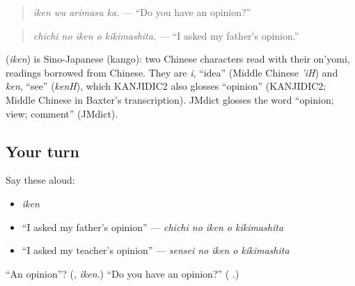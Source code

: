 \begin{quote}
\textbf{ }
\end{quote}

\begin{quote}
\emph{iken wa arimasu ka.} — \textquotedblleft{}Do you have an opinion?\textquotedblright{}
\end{quote}

\begin{quote}
\textbf{  }
\end{quote}

\begin{quote}
\emph{chichi no iken o kikimashita.} — \textquotedblleft{}I asked my father's opinion.\textquotedblright{}
\end{quote}

\begin{cousinweb}
\textbf{} (\emph{iken}) is Sino-Japanese (kango): two Chinese characters read with their on'yomi, readings borrowed from Chinese. They are \emph{i}, \textquotedblleft{}idea\textquotedblright{} (Middle Chinese \emph{'iH}) and \emph{ken}, \textquotedblleft{}see\textquotedblright{} (\emph{kenH}), which KANJIDIC2 also glosses \textquotedblleft{}opinion\textquotedblright{} (KANJIDIC2; Middle Chinese in Baxter's transcription). JMdict glosses the word \textquotedblleft{}opinion; view; comment\textquotedblright{} (JMdict).
\end{cousinweb}

\subsection*{Your turn}
Say these aloud:

\begin{itemize}
\raggedright
  \item \emph{iken}
  \item \textquotedblleft{}I asked my father's opinion\textquotedblright{} — \emph{chichi no iken o kikimashita}
  \item \textquotedblleft{}I asked my teacher's opinion\textquotedblright{} — \emph{sensei no iken o kikimashita}
\end{itemize}

\begin{tcolorbox}[breakable,colback=teal!4,colframe=teal!35!black,title={Before you move on}]
\textquotedblleft{}An opinion\textquotedblright{}? (\textbf{}, \emph{iken}.) \textquotedblleft{}Do you have an opinion?\textquotedblright{} (\textbf{ }.)
\end{tcolorbox}
